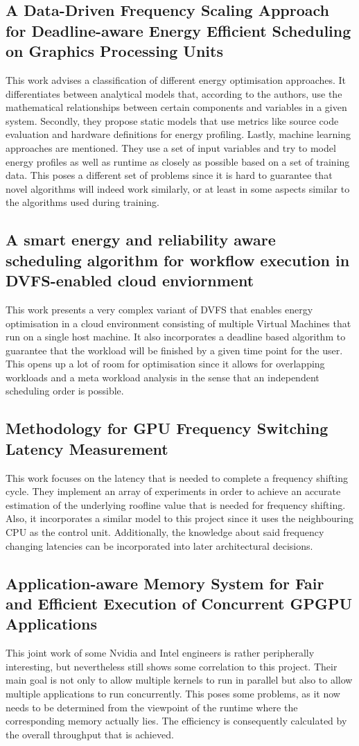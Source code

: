 \documentclass[12pt]{article}
\begin{document}
\subsection{A Data-Driven Frequency Scaling Approach for Deadline-aware Energy Efficient Scheduling on Graphics Processing Units}
This work advises a classification of different energy optimisation approaches. It differentiates between analytical models that, according to the authors, use the mathematical relationships between certain components and variables in a given system. Secondly, they propose static models that use metrics like source code evaluation and hardware definitions for energy profiling. Lastly, machine learning approaches are mentioned. They use a set of input variables and try to model energy profiles as well as runtime as closely as possible based on a set of training data. This poses a different set of problems since it is hard to guarantee that novel algorithms will indeed work similarly, or at least in some aspects similar to the algorithms used during training.
\subsection{A smart energy and reliability aware scheduling algorithm for workflow execution in DVFS-enabled cloud enviornment}
This work presents a very complex variant of DVFS that enables energy optimisation in a cloud environment consisting of multiple Virtual Machines that run on a single host machine. It also incorporates a deadline based algorithm to guarantee that the workload will be finished by a given time point for the user. This opens up a lot of room for optimisation since it allows for overlapping workloads and a meta workload analysis in the sense that an independent scheduling order is possible.
\subsection{Methodology for GPU Frequency Switching Latency Measurement}
This work focuses on the latency that is needed to complete a frequency shifting cycle. They implement an array of experiments in order to achieve an accurate estimation of the underlying roofline value that is needed for frequency shifting. Also, it incorporates a similar model to this project since it uses the neighbouring CPU as the control unit. Additionally, the knowledge about said frequency changing latencies can be incorporated into later architectural decisions.
\subsection{Application-aware Memory System for Fair and Efficient Execution of Concurrent GPGPU Applications}
This joint work of some Nvidia and Intel engineers is rather peripherally interesting, but nevertheless still shows some correlation to this project. Their main goal is not only to allow multiple kernels to run in parallel but also to allow multiple applications to run concurrently. This poses some problems, as it now needs to be determined from the viewpoint of the runtime where the corresponding memory actually lies. The efficiency is consequently calculated by the overall throughput that is achieved.
\end{document}
